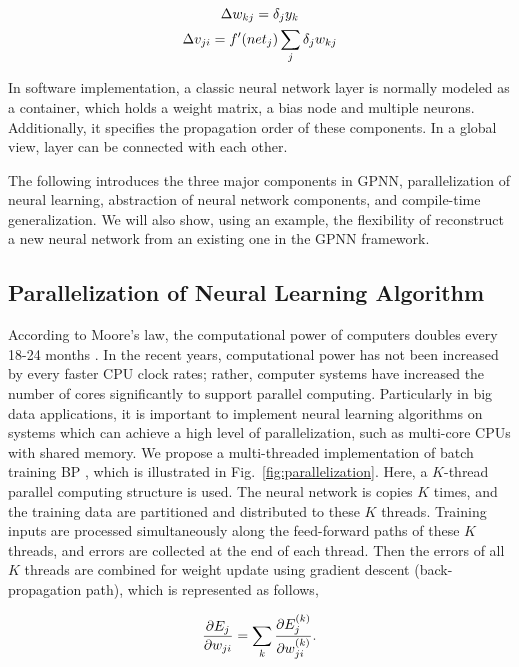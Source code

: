 \documentclass[procedia]{easychair}
\begin{document}
\begin{gather}
    \Delta w_{kj} = \delta_j y_k \notag \\
    \Delta v_{ji} = f'(net_j) \sum_j {\delta_j w_{kj}} \notag
\end{gather}

In software implementation, a classic neural network layer is normally modeled as a container, which holds a weight matrix, a bias node and multiple neurons.  Additionally, it specifies the propagation order of these components.  In a global view, layer can be connected with each other.

The following introduces the three major components in GPNN, parallelization of neural learning, abstraction of neural network components, and compile-time generalization.  We will also show, using an example, the flexibility of reconstruct a new neural network from an existing one in the GPNN framework.

\subsection{Parallelization of Neural Learning Algorithm}

According to Moore’s law, the computational power of computers doubles every 18-24 months \cite{chu2007map}.  In the recent years, computational power has not been increased by every faster CPU clock rates; rather, computer systems have increased the number of cores significantly to support parallel computing.  Particularly in big data applications, it is important to implement neural learning algorithms on systems which can achieve a high level of parallelization, such as multi-core CPUs with shared memory.  We propose a multi-threaded implementation of batch training BP \cite{schuessler2011parallel}, which is illustrated in Fig.~\ref{fig:parallelization}.  Here, a $K$-thread parallel computing structure is used.  The neural network is copies $K$ times, and the training data are partitioned and distributed to these $K$ threads.  Training inputs are processed simultaneously along the feed-forward paths of these $K$ threads, and errors are collected at the end of each thread.  Then the errors of all $K$ threads are combined for weight update using gradient descent (back-propagation path), which is represented as follows,

\begin{equation}
    \frac{\partial E_j}{\partial w_{ji}} = \sum_k \frac{\partial E_j^{(k)}}{\partial w_{ji}^{(k)}} \text{.} \notag
\end{equation}
\end{document}
